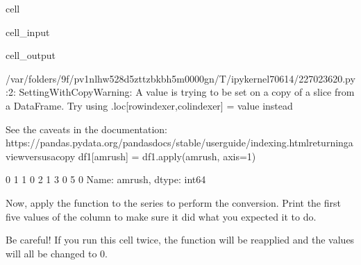 \documentclass[letterpaper,10pt,english]{sphinxmanual}
\begin{document}
\begin{sphinxuseclass}{cell}
\begin{sphinxuseclass}{cell_input}
\begin{sphinxVerbatim}[commandchars=\\\{\}]
\PYG{p}{[}\PYG{p}{]}   
\PYG{p}{[}\PYG{p}{]}
\end{sphinxVerbatim}

\end{sphinxuseclass}
\begin{sphinxuseclass}{cell_output}
\begin{sphinxVerbatim}[commandchars=\\\{\}]
/var/folders/9f/pv1nlhw528d\PYGZus{}5zttzbkb\PYGZus{}h5m0000gn/T/ipykernel\PYGZus{}70614/227023620.py:2: SettingWithCopyWarning: 
A value is trying to be set on a copy of a slice from a DataFrame.
Try using .loc[row\PYGZus{}indexer,col\PYGZus{}indexer] = value instead

See the caveats in the documentation: https://pandas.pydata.org/pandas\PYGZhy{}docs/stable/user\PYGZus{}guide/indexing.html\PYGZsh{}returning\PYGZhy{}a\PYGZhy{}view\PYGZhy{}versus\PYGZhy{}a\PYGZhy{}copy
  df1[\PYGZsq{}am\PYGZus{}rush\PYGZsq{}] = df1.apply(am\PYGZus{}rush, axis=1)
\end{sphinxVerbatim}

\begin{sphinxVerbatim}[commandchars=\\\{\}]
0    1
1    0
2    1
3    0
5    0
Name: am\PYGZus{}rush, dtype: int64
\end{sphinxVerbatim}

\end{sphinxuseclass}
\end{sphinxuseclass}
\sphinxAtStartPar
Now, apply the  function to the  series to perform the conversion. Print the first five values of the column to make sure it did what you expected it to do.

\sphinxAtStartPar
{} Be careful! If you run this cell twice, the function will be reapplied and the values will all be changed to 0.
\end{document}
